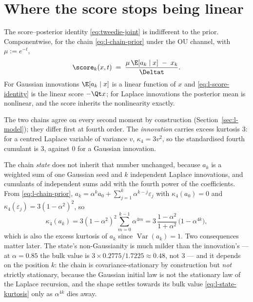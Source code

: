 \section{Where the score stops being linear}
\label{sec:l-nonlinear}\label{sec:l-K1}

The score--posterior identity \eqref{eq:tweedie-joint} is indifferent to the
prior. Componentwise, for the chain \eqref{eq:l-chain-prior} under the OU
channel, with $\mu := e^{-t}$,
\begin{equation}
  \score_k(x,t) \;=\; \frac{\mu\, \E[a_k \mid x] \;-\; x_k}{\Deltat} .
  \label{eq:l-score-identity}
\end{equation}
For Gaussian innovations $\E[a_k \mid x]$ is a linear function of
$x$ and \eqref{eq:l-score-identity} is the linear score $-\Qt x$; for Laplace
innovations the posterior mean is nonlinear, and the score inherits the
nonlinearity exactly.

The two chains agree on every second moment by construction
(Section~\ref{sec:l-model}); they differ first at fourth order. The
\emph{innovation} carries excess kurtosis $3$: for a centred Laplace variable
of variance $v$, $\kappa_4 = 3v^2$, so the standardised fourth cumulant is
$3$, against $0$ for a Gaussian innovation.

The chain \emph{state} does not inherit that number unchanged, because
$a_k$ is a weighted sum of one Gaussian seed and $k$ independent Laplace
innovations, and cumulants of independent sums add with the fourth power of
the coefficients. From \eqref{eq:l-chain-prior},
$a_k = \alpha^k a_0 + \sum_{j=1}^{k}\alpha^{k-j}\varepsilon_j$ with
$\kappa_4(a_0) = 0$ and
$\kappa_4(\varepsilon_j) = 3(1-\alpha^2)^2$, so
\begin{equation}
    \kappa_4(a_k)
    = 3(1-\alpha^2)^2\sum_{m=0}^{k-1}\alpha^{4m}
    = 3\,\frac{1-\alpha^2}{1+\alpha^2}\,\bigl(1-\alpha^{4k}\bigr),
    \label{eq:l-state-kurtosis}
\end{equation}
which is also the excess kurtosis of $a_k$ since
$\operatorname{Var}(a_k) = 1$. Two consequences matter later. The state's
non-Gaussianity is much milder than the innovation's --- at $\alpha = 0.85$
the bulk value is $3 \times 0.2775/1.7225 \approx 0.48$, not $3$ --- and it
depends on the position $k$: the chain is covariance-stationary by
construction but \emph{not} strictly stationary, because the Gaussian initial
law is not the stationary law of the Laplace recursion, and the shape settles
towards its bulk value \eqref{eq:l-state-kurtosis} only as $\alpha^{4k}$
dies away.

